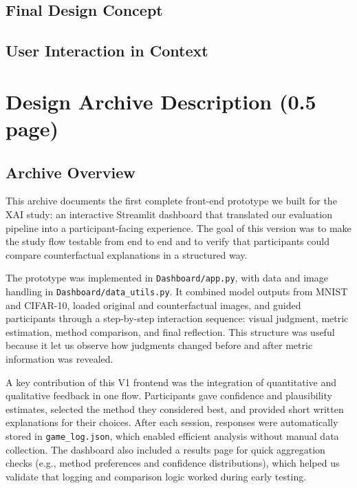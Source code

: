 \documentclass[
  letterpaper,
  DIV=11,
  numbers=noendperiod]{scrartcl}
\begin{document}
\subsection{Final Design Concept}\label{final-design-concept}

\subsection{User Interaction in
Context}\label{user-interaction-in-context}

\section{Design Archive Description (0.5
page)}\label{design-archive-description-0.5-page}

\subsection{Archive Overview}\label{archive-overview}

This archive documents the first complete front-end prototype we built
for the XAI study: an interactive Streamlit dashboard that translated
our evaluation pipeline into a participant-facing experience. The goal
of this version was to make the study flow testable from end to end and
to verify that participants could compare counterfactual explanations in
a structured way.

The prototype was implemented in \texttt{Dashboard/app.py}, with data
and image handling in \texttt{Dashboard/data\_utils.py}. It combined
model outputs from MNIST and CIFAR-10, loaded original and
counterfactual images, and guided participants through a step-by-step
interaction sequence: visual judgment, metric estimation, method
comparison, and final reflection. This structure was useful because it
let us observe how judgments changed before and after metric information
was revealed.

A key contribution of this V1 frontend was the integration of
quantitative and qualitative feedback in one flow. Participants gave
confidence and plausibility estimates, selected the method they
considered best, and provided short written explanations for their
choices. After each session, responses were automatically stored in
\texttt{game\_log.json}, which enabled efficient analysis without manual
data collection. The dashboard also included a results page for quick
aggregation checks (e.g., method preferences and confidence
distributions), which helped us validate that logging and comparison
logic worked during early testing.
\end{document}

